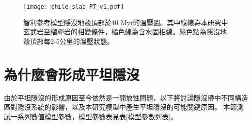 \begin{figure*}[ht!]
    \centering
    \texttt{[image: chile\_slab\_PT\_v1.pdf]}
    \caption[智利參考模型隱沒地殼頂部於40 Myr的溫壓圖]{智利參考模型隱沒地殼頂部於40 Myr的溫壓圖。其中綠線為本研究中玄武岩至榴輝岩的相變條件，橘色線為含水固相線。綠色點為隱沒地殼頂部每2-5公里的溫壓狀態。
    }
    \label{fig::chile_slab_PT}
\end{figure*}

\newpage
\section{為什麼會形成平坦隱沒}
由於平坦隱沒的形成原因至今依然是一開放性問題，以下將討論隱沒帶中不同構造區對隱沒系統的影響，以及本研究模型中產生平坦隱沒的可能關鍵原因。
本節測試一系列數值模型參數，模型參數表見表\ref{模型參數列表}。


